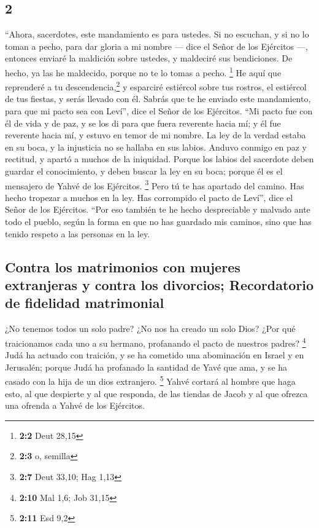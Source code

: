 \begin{paracol}{2}
\hypertarget{section-2}{%
\section{2}\label{section-2}}

 ``Ahora, sacerdotes, este mandamiento es para ustedes.
 Si no escuchan, y si no lo toman a pecho, para dar gloria
a mi nombre --- dice el Señor de los Ejércitos ---, entonces enviaré la
maldición sobre ustedes, y maldeciré sus bendiciones. De hecho, ya las
he maldecido, porque no te lo tomas a pecho. \footnote{\textbf{2:2} Deut
  28,15}  He aquí que reprenderé a tu
descendencia,\footnote{\textbf{2:3} o, semilla} y esparciré estiércol
sobre tus rostros, el estiércol de tus fiestas, y serás llevado con él.
 Sabrás que te he enviado este mandamiento, para que mi
pacto sea con Leví'', dice el Señor de los Ejércitos. 
``Mi pacto fue con él de vida y de paz, y se los di para que fuera
reverente hacia mí; y él fue reverente hacia mí, y estuvo en temor de mi
nombre.  La ley de la verdad estaba en su boca, y la
injusticia no se hallaba en sus labios. Anduvo conmigo en paz y
rectitud, y apartó a muchos de la iniquidad.  Porque los
labios del sacerdote deben guardar el conocimiento, y deben buscar la
ley en su boca; porque él es el mensajero de Yahvé de los Ejércitos.
\footnote{\textbf{2:7} Deut 33,10; Hag 1,13}  Pero tú te
has apartado del camino. Has hecho tropezar a muchos en la ley. Has
corrompido el pacto de Leví'', dice el Señor de los Ejércitos.
 ``Por eso también te he hecho despreciable y malvado ante
todo el pueblo, según la forma en que no has guardado mis caminos, sino
que has tenido respeto a las personas en la ley.

\hypertarget{contra-los-matrimonios-con-mujeres-extranjeras-y-contra-los-divorcios-recordatorio-de-fidelidad-matrimonial}{%
\subsection{Contra los matrimonios con mujeres extranjeras y contra los
divorcios; Recordatorio de fidelidad
matrimonial}\label{contra-los-matrimonios-con-mujeres-extranjeras-y-contra-los-divorcios-recordatorio-de-fidelidad-matrimonial}}

 ¿No tenemos todos un solo padre? ¿No nos ha creado un
solo Dios? ¿Por qué traicionamos cada uno a su hermano, profanando el
pacto de nuestros padres? \footnote{\textbf{2:10} Mal 1,6; Job 31,15}
 Judá ha actuado con traición, y se ha cometido una
abominación en Israel y en Jerusalén; porque Judá ha profanado la
santidad de Yavé que ama, y se ha casado con la hija de un dios
extranjero. \footnote{\textbf{2:11} Esd 9,2}  Yahvé
cortará al hombre que haga esto, al que despierte y al que responda, de
las tiendas de Jacob y al que ofrezca una ofrenda a Yahvé de los
Ejércitos.


\end{paracol}
